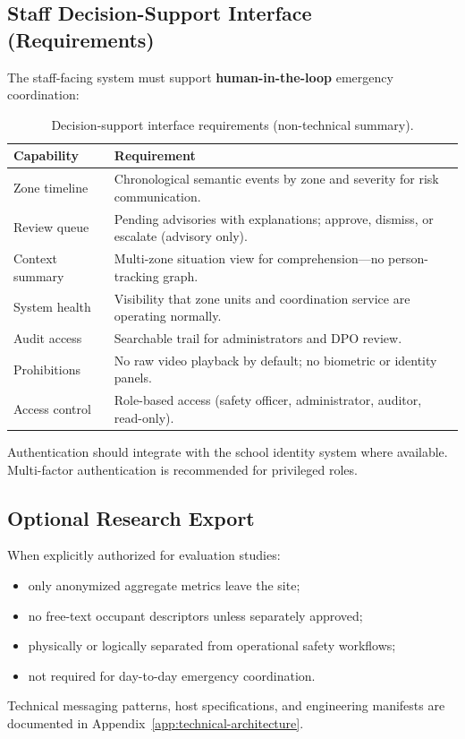\subsection{Staff Decision-Support Interface (Requirements)}

The staff-facing system must support \textbf{human-in-the-loop} emergency coordination:

\begin{table}[htbp]
  \centering
  \caption{Decision-support interface requirements (non-technical summary).}
  \label{tab:dashboard-req}
  \small
  \begin{tabular}{@{}p{3.2cm}p{8.8cm}@{}}
    \toprule
    Capability & Requirement \\
    \midrule
    Zone timeline &
      Chronological semantic events by zone and severity for risk communication. \\
    Review queue &
      Pending advisories with explanations; approve, dismiss, or escalate (advisory only). \\
    Context summary &
      Multi-zone situation view for comprehension---no person-tracking graph. \\
    System health &
      Visibility that zone units and coordination service are operating normally. \\
    Audit access &
      Searchable trail for administrators and DPO review. \\
    Prohibitions &
      No raw video playback by default; no biometric or identity panels. \\
    Access control &
      Role-based access (safety officer, administrator, auditor, read-only). \\
    \bottomrule
  \end{tabular}
\end{table}

Authentication should integrate with the school identity system where available.
Multi-factor authentication is recommended for privileged roles.

\subsection{Optional Research Export}

When explicitly authorized for evaluation studies:
\begin{itemize}[noitemsep]
  \item only anonymized aggregate metrics leave the site;
  \item no free-text occupant descriptors unless separately approved;
  \item physically or logically separated from operational safety workflows;
  \item not required for day-to-day emergency coordination.
\end{itemize}

Technical messaging patterns, host specifications, and engineering manifests are documented
in Appendix~\ref{app:technical-architecture}.
